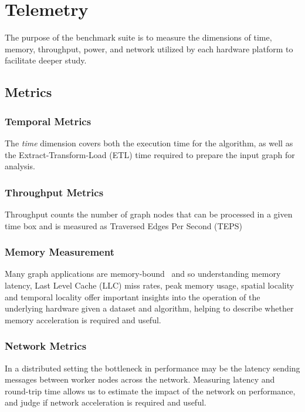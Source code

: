 \section{Telemetry}\label{section:telemetry}
    \par{
    The purpose of the benchmark suite is to measure the dimensions of time, memory, throughput, power, and network utilized by each hardware platform to facilitate deeper study. 
    } 

    \subsection{Metrics}
    \subsubsection{Temporal Metrics}
    The \textit{time} dimension covers both the execution time for the algorithm, as well as the Extract-Transform-Load (ETL) time required to prepare the input graph for analysis. 
    
    \subsubsection{Throughput Metrics}
    Throughput counts the number of graph nodes that can be processed in a given time box and is measured as Traversed Edges Per Second (TEPS)

    \subsubsection{Memory Measurement}
    Many graph applications are memory-bound~\cite{Aananthakrishnan2020, Beamer2015} and so understanding memory latency, Last Level Cache (LLC) miss rates, peak memory usage, spatial locality and temporal locality offer important insights into the operation of the underlying hardware given a dataset and algorithm, helping to describe whether memory acceleration is required and useful.
    
    \subsubsection{Network Metrics}
    In a distributed setting the bottleneck in performance may be the latency sending messages between worker nodes across the network. 
    Measuring latency and round-trip time allows us to estimate the impact of the network on performance, and judge if network acceleration is required and useful. 

